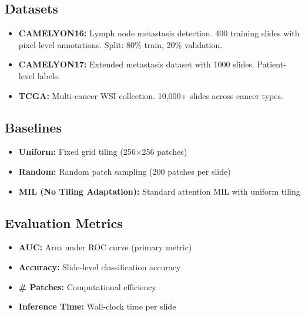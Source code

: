 \documentclass[runningheads]{llncs}
\begin{document}
\label{sec:experiments}

\subsection{Datasets}

\begin{itemize}

\item \textbf{CAMELYON16:} Lymph node metastasis detection. 400 training slides with pixel-level annotations. Split: 80\% train, 20\% validation.

\item \textbf{CAMELYON17:} Extended metastasis dataset with 1000 slides. Patient-level labels.

\item \textbf{TCGA:} Multi-cancer WSI collection. 10,000+ slides across cancer types.

\end{itemize}

\subsection{Baselines}

\begin{itemize}

\item \textbf{Uniform:} Fixed grid tiling (256$\times$256 patches)

\item \textbf{Random:} Random patch sampling (200 patches per slide)

\item \textbf{MIL (No Tiling Adaptation):} Standard attention MIL with uniform tiling

\end{itemize}

\subsection{Evaluation Metrics}

\begin{itemize}

\item \textbf{AUC:} Area under ROC curve (primary metric)

\item \textbf{Accuracy:} Slide-level classification accuracy

\item \textbf{\# Patches:} Computational efficiency

\item \textbf{Inference Time:} Wall-clock time per slide

\end{itemize}
\end{document}
